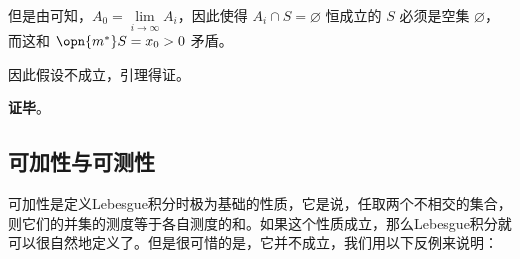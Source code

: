 但是由可知，$A_0=\lim\limits_{i\to\infty} A_i$，因此使得 $A_i\cap S=\varnothing$ 恒成立的 $S$ 必须是空集 $\varnothing$，而这和 $\opn{m^*}S=x_0>0$ 矛盾。

因此假设不成立，引理得证。

\textbf{证毕}。






\subsection{可加性与可测性}

可加性是定义Lebesgue积分时极为基础的性质，它是说，任取两个不相交的集合，则它们的并集的测度等于各自测度的和。如果这个性质成立，那么Lebesgue积分就可以很自然地定义了。但是很可惜的是，它并不成立，我们用以下反例来说明：

